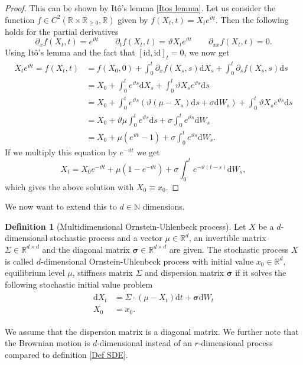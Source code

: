 \documentclass[11pt,titlepage]{article}
\newcommand{\R}{\mathbb{R}} %
\newcommand{\N}{\mathbb{N}} %
\theoremstyle{definition}
\newtheorem{definition}[theorem]{Definition}
\theoremstyle{remark}
\begin{document}
	\begin{proof}
		This can be shown by Itô's lemma \ref{Itos lemma}. Let us consider the function  
		$f\in C^2(\R\times\R_{\geq 0},\R)$ given by $f(X_t,t)=X_t e^{\vartheta t}$. Then the following holds for the partial derivatives
		\[\partial_x f(X_t,t)=e^{\vartheta t}\qquad \partial_t f(X_t,t)=\vartheta X_t e^{\vartheta t}
		\qquad \partial_{xx}f(X_t,t)=0.\] 
		Using Itô's lemma and the fact that $[\mathrm{id},\mathrm{id}]_t=0$, we now get
		\begin{align*}
			X_t e^{\vartheta t}=f(X_t,t)&=f(X_0,0) +\int_0^t \partial_x f(X_s,s)\mathrm{d}X_s +
			\int_0^t \partial_s f(X_s,s)\mathrm{d}s\\
			&=X_0 + \int_0^t e^{\vartheta s} \mathrm{d}X_s +
			\int_0^t \vartheta X_s e^{\vartheta s}\mathrm{d}s\\
			&=X_0 + \int_0^t e^{\vartheta s} (\vartheta(\mu -X_s)\mathrm{d}s +\sigma \mathrm{d}W_s) +
			\int_0^t \vartheta X_s e^{\vartheta s}\mathrm{d}s\\
			&=X_0 +\vartheta \mu \int_0^t e^{\vartheta s}\mathrm{d}s +
			\sigma \int_0^t e^{\vartheta s}\mathrm{d}W_s \\
			&=X_0 + \mu (e^{\vartheta t}-1) + \sigma \int_0^t e^{\vartheta s}\mathrm{d}W_s.
		\end{align*}
		If we multiply this equation by $e^{-\vartheta t}$ we get 
		\[X_t = X_0 e^{-\vartheta t} +\mu (1-e^{-\vartheta t}) +\sigma\int_0^t e^{-\vartheta(t-s)}\mathrm{d}W_s,\]
		which gives the above solution with $X_0\equiv x_0$.
	\end{proof}

	We now want to extend this to $d\in\N$ dimensions.
	
	\begin{definition}[Multidimensional Ornstein-Uhlenbeck process] \label{Def multidim  OUP}
		Let $X$ be a $d$-dimensional stochastic process and a vector $\mu\in\R^d$, 
		an invertible
		matrix $\Sigma\in\R^{d\times d}$ and the diagonal matrix $\boldsymbol{\sigma}\in\R^{d\times d}$
		are given. The stochastic process $X$ is called $d$-dimensional Ornstein-Uhlenbeck process with initial value $x_0\in\R^d$, equilibrium level $\mu$, stiffness matrix 
		$\Sigma$ and dispersion matrix $\boldsymbol{\sigma}$ 
		if it solves the following stochastic initial value problem
		\begin{align}
			\begin{split}
				\mathrm{d}X_t &= \Sigma\cdot (\mu-X_t)\mathrm{d}t +\boldsymbol{\sigma} \mathrm{d}W_t\\
				X_0&=x_0. \label{ddim_OUP}
			\end{split}
		\end{align}
	\end{definition}
	\noindent
	We assume that the dispersion matrix is a diagonal matrix. 
	We further note that the Brownian motion is $d$-dimensional instead of an $r$-dimensional process compared to definition \ref{Def SDE}.
	
\end{document}
